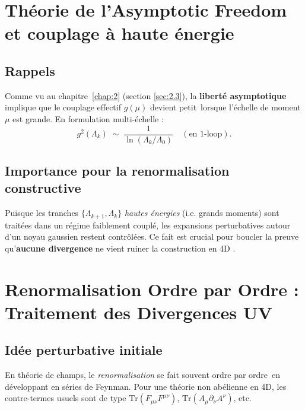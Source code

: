 \vspace{1em}

\section{Théorie de l’Asymptotic Freedom et couplage à haute énergie}
\label{sec:5.3}

\subsection*{Rappels}
Comme vu au chapitre~\ref{chap:2} (section \ref{sec:2.3}), la \textbf{liberté asymptotique} implique que le couplage effectif \(g(\mu)\) devient \og petit\fg\ lorsque l’échelle de moment \(\mu\) est grande. En formulation multi-échelle :
\[
g^2(\Lambda_k) \;\sim\; \frac{1}{\ln(\Lambda_k/\Lambda_0)} \quad (\text{en 1-loop}).
\]

\subsection*{Importance pour la renormalisation constructive}
Puisque les tranches \(\{ \Lambda_{k+1}, \Lambda_k \}\) \emph{hautes énergies} (i.e. grands moments) sont traitées dans un régime \og faiblement couplé\fg, les expansions perturbatives autour d’un noyau gaussien restent contrôlées. Ce fait est crucial pour boucler la preuve qu’\textbf{aucune divergence} ne vient ruiner la construction en 4D \cite{Rivasseau1991,Freedman1982}.

\vspace{1em}

\section{Renormalisation Ordre par Ordre : Traitement des Divergences UV}
\label{sec:5.4}

\subsection*{Idée perturbative initiale}
En théorie de champs, le \emph{renormalisation} se fait souvent \og ordre par ordre\fg\ en développant en séries de Feynman. Pour une théorie non abélienne en 4D, les contre-termes usuels sont de type \(\mathrm{Tr}(F_{\mu\nu}F^{\mu\nu})\), \(\mathrm{Tr}(A_\mu \partial_\nu A^\nu)\), etc.

